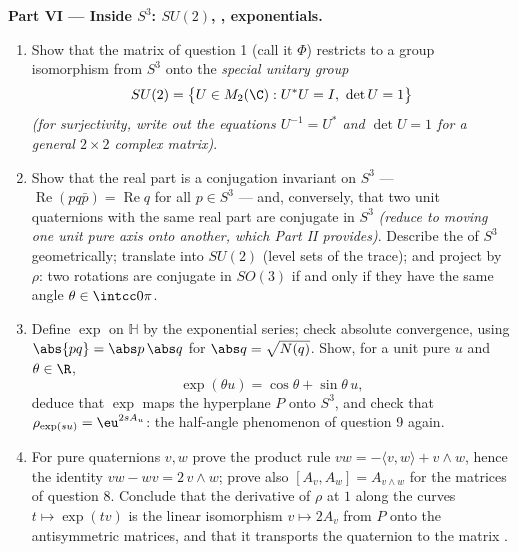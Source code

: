 \begin{problem}
\medskip
\noindent\textbf{Part VI --- Inside $S^3$: $SU(2)$,
, exponentials.}
\begin{enumerate}[resume]
  \item Show that the matrix  of question 1
        (call it $\Phi$) restricts to a group isomorphism
        from $S^3$ onto the \emph{special unitary group}
        \[
        SU(2) = \bigl\{U \in M_2(\C) : U^*U = I,\ \det U =
        1\bigr\}
        \]
        \emph{(for surjectivity, write out the equations
        $U^{-1} = U^*$ and $\det U = 1$ for a general
        $2\times2$ complex matrix)}.
  \item Show that the real part is a conjugation invariant
        on $S^3$ --- $\operatorname{Re}(pq\bar p) =
        \operatorname{Re}q$ for all $p \in S^3$ --- and,
        conversely, that two unit quaternions with the same
        real part are conjugate in $S^3$ \emph{(reduce to
        moving one unit pure axis onto another, which Part
        II provides)}. Describe the  of
        $S^3$ geometrically; translate into $SU(2)$ (level
        sets of the trace); and project by $\rho$: two
        rotations are conjugate in $SO(3)$ if and only if
        they have the same angle $\theta \in \intcc0\pi$.
  \item Define $\exp$ on $\mathbb H$ by the exponential
        series; check absolute convergence, using
        $\abs{pq} = \abs p\,\abs q$ for $\abs q =
        \sqrt{N(q)}$. Show, for a unit pure $u$ and $\theta
        \in \R$,
        \[
        \exp(\theta u) = \cos\theta + \sin\theta\,u ,
        \]
        deduce that $\exp$ maps the hyperplane $P$ onto
        $S^3$, and check that $\rho_{\exp(su)} =
        \eu^{2sA_u}$: the half-angle phenomenon of question
        9 again.
  \item For pure quaternions $v, w$ prove the product rule
        $vw = -\langle v, w\rangle + v\wedge w$, hence the
         identity $vw - wv = 2\,v\wedge w$; prove
        also $[A_v, A_w] = A_{v\wedge w}$ for the matrices
        of question 8. Conclude that the derivative of
        $\rho$ at $1$ along the curves $t \mapsto \exp(tv)$
        is the linear isomorphism $v \mapsto 2A_v$ from $P$
        onto the antisymmetric matrices, and that it
        transports the quaternion  to the matrix
        .
\end{enumerate}


\end{problem}

